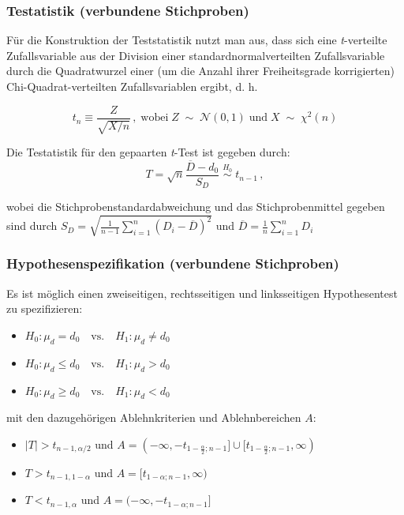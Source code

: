 \documentclass{beamer}
\begin{document}
\begin{frame}
\frametitle{Testatistik (verbundene Stichproben)}

Für die Konstruktion der Teststatistik nutzt man aus, dass sich eine \textit{t}-verteilte Zufallsvariable aus der Division einer standardnormalverteilten Zufallsvariable durch die Quadratwurzel einer (um die Anzahl ihrer Freiheitsgrade korrigierten) Chi-Quadrat-verteilten Zufallsvariablen ergibt, d. h. 

\[t_n\equiv\frac{Z}{\sqrt{X/n}}\,, \; \text{wobei} \; Z\;  \sim \;\mathcal{N}(0,1)\; \text{und} \; X\;  \sim \; \chi^2(n)\]

Die Testatistik für den gepaarten \textit{t}-Test ist gegeben durch:
\[ T=\sqrt{n}\frac{\overline{D}-d_0}{S_D}  \; \stackrel{H_0}{\sim} \; t_{n-1}\,,\]

wobei die Stichprobenstandardabweichung und das Stichprobenmittel gegeben sind durch $S_D = \sqrt{ \frac{1}{n-1}\sum_{i=1}^n (D_i-\overline{D})^2 }$ und $\overline{D} = \frac{1}n\sum_{i=1}^n D_i$

\end{frame}

\begin{frame}
\frametitle{Hypothesenspezifikation (verbundene Stichproben)}

Es ist möglich einen zweiseitigen, rechtsseitigen und linksseitigen Hypothesentest zu spezifizieren:
\begin{itemize}
\item $H_0\colon \mu_{d} = d_{0} \quad \text{vs.} \quad H_1\colon \mu_{d} \ne d_{0}$
\item $H_0\colon \mu_{d} \leq d_{0} \quad \text{vs.} \quad H_1\colon \mu_{d} > d_{0}$
\item $H_0\colon \mu_{d} \geq d_{0} \quad \text{vs.} \quad H_1\colon \mu_{d} < d_{0}$
\end{itemize}

mit den dazugehörigen Ablehnkriterien und Ablehnbereichen $A$:
\begin{itemize}
\item $|T|>t_{n-1, \alpha/2}$ und $A =(-\infty,-t_{1-\frac{\alpha}2;n-1}]\cup [t_{1-\frac{\alpha}2;n-1},\infty)$
\item $T>t_{n-1, 1-\alpha}$ und $A = [t_{1-\alpha;n-1},\infty)$
\item $T < t_{n-1, \alpha}$ und $A = (-\infty,-t_{1-\alpha;n-1}]$
\end{itemize}


\end{frame}
\end{document}
